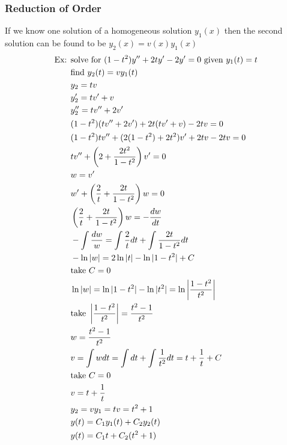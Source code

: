 \documentclass[11pt, fleqn]{article}
\begin{document}
\subsubsection{Reduction of Order}
If we know one solution of a homogeneous solution $y_1(x)$ then the second solution can be found to be $y_2(x)=v(x)y_1(x)$
\begin{align*}
    \text{Ex: }&\text{solve for }(1-t^2)y''+2ty'-2y'=0\ \text{given }y_1(t)=t\\
    &\text{find }y_2(t)=vy_1(t)\\
    &y_2=tv\\
    &y_2'=tv'+v\\
    &y_2''=tv''+2v'\\
    &(1-t^2)(tv''+2v')+2t(tv'+v)-2tv=0\\
    &(1-t^2)tv''+(2(1-t^2)+2t^2)v'+2tv-2tv=0\\
    &tv''+\left( 2+\frac{2t^2}{1-t^2} \right)v'=0\\
    &w=v'\\
    &w'+\left( \frac{2}{t}+\frac{2t}{1-t^2} \right)w=0\\
    &\left( \frac{2}{t}+\frac{2t}{1-t^2} \right)w=-\frac{dw}{dt}\\
    &-\int\frac{dw}{w}=\int\frac{2}{t}dt+\int\frac{2t}{1-t^2}dt\\
    &-\ln|w|=2\ln|t|-\ln|1-t^2|+C\\
    &\text{take }C=0\\
    &\ln|w|=\ln|1-t^2|-\ln|t^2|=\ln\left| \frac{1-t^2}{t^2} \right|\\
    &\text{take }\left| \frac{1-t^2}{t^2} \right|=\frac{t^2-1}{t^2}\\
    &w=\frac{t^2-1}{t^2}\\
    &v=\int wdt=\int dt+\int\frac{1}{t^2}dt=t+\frac{1}{t}+C\\
    &\text{take }C=0\\
    &v=t+\frac{1}{t}\\
    &y_2=vy_1=tv=t^2+1\\
    &y(t)=C_1y_1(t)+C_2y_2(t)\\
    &y(t)=C_1t+C_2(t^2+1)
\end{align*}
\end{document}
